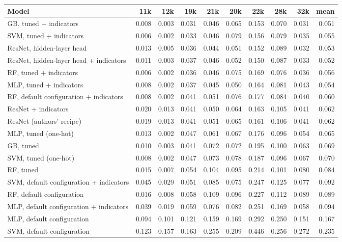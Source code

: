 \begin{tabular}{lrrrrrrrrr}
\toprule
Model & 11k & 12k & 19k & 21k & 20k & 22k & 28k & 32k & mean \\
\midrule
GB, tuned + indicators & 0.008 & 0.003 & 0.031 & 0.046 & 0.065 & 0.153 & 0.070 & 0.031 & 0.051 \\
SVM, tuned + indicators & 0.006 & 0.002 & 0.033 & 0.046 & 0.079 & 0.156 & 0.079 & 0.035 & 0.055 \\
ResNet, hidden-layer head & 0.013 & 0.005 & 0.036 & 0.044 & 0.051 & 0.152 & 0.089 & 0.032 & 0.053 \\
ResNet, hidden-layer head + indicators & 0.011 & 0.003 & 0.037 & 0.046 & 0.052 & 0.150 & 0.087 & 0.033 & 0.052 \\
RF, tuned + indicators & 0.006 & 0.002 & 0.036 & 0.046 & 0.075 & 0.169 & 0.076 & 0.036 & 0.056 \\
MLP, tuned + indicators & 0.008 & 0.002 & 0.037 & 0.045 & 0.050 & 0.164 & 0.081 & 0.043 & 0.054 \\
RF, default configuration + indicators & 0.008 & 0.002 & 0.041 & 0.051 & 0.076 & 0.177 & 0.084 & 0.040 & 0.060 \\
ResNet + indicators & 0.020 & 0.013 & 0.041 & 0.050 & 0.064 & 0.163 & 0.105 & 0.041 & 0.062 \\
ResNet (authors' recipe) & 0.019 & 0.013 & 0.041 & 0.051 & 0.065 & 0.161 & 0.106 & 0.041 & 0.062 \\
MLP, tuned (one-hot) & 0.013 & 0.002 & 0.047 & 0.061 & 0.067 & 0.176 & 0.096 & 0.054 & 0.065 \\
GB, tuned & 0.010 & 0.003 & 0.041 & 0.072 & 0.072 & 0.195 & 0.100 & 0.063 & 0.069 \\
SVM, tuned (one-hot) & 0.008 & 0.002 & 0.047 & 0.073 & 0.078 & 0.187 & 0.096 & 0.067 & 0.070 \\
RF, tuned & 0.015 & 0.007 & 0.054 & 0.104 & 0.095 & 0.214 & 0.101 & 0.080 & 0.084 \\
SVM, default configuration + indicators & 0.045 & 0.029 & 0.051 & 0.085 & 0.075 & 0.247 & 0.125 & 0.077 & 0.092 \\
RF, default configuration & 0.016 & 0.008 & 0.058 & 0.109 & 0.096 & 0.227 & 0.112 & 0.089 & 0.089 \\
MLP, default configuration + indicators & 0.039 & 0.019 & 0.059 & 0.076 & 0.082 & 0.251 & 0.169 & 0.058 & 0.094 \\
MLP, default configuration & 0.094 & 0.101 & 0.121 & 0.159 & 0.169 & 0.292 & 0.250 & 0.151 & 0.167 \\
SVM, default configuration & 0.123 & 0.157 & 0.163 & 0.255 & 0.209 & 0.446 & 0.256 & 0.272 & 0.235 \\
\bottomrule
\end{tabular}
